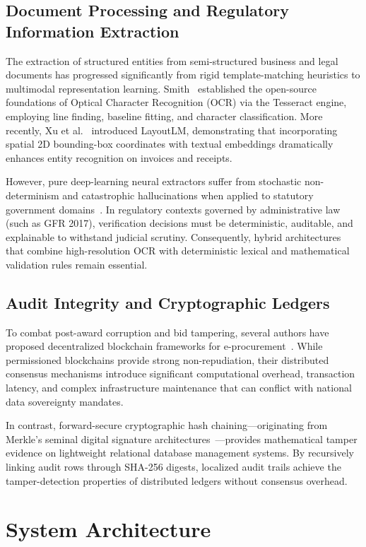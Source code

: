 \documentclass[conference]{IEEEtran}
\begin{document}
\subsection{Document Processing and Regulatory Information Extraction}
The extraction of structured entities from semi-structured business and legal documents has progressed significantly from rigid template-matching heuristics to multimodal representation learning. Smith~\cite{smith2007} established the open-source foundations of Optical Character Recognition (OCR) via the Tesseract engine, employing line finding, baseline fitting, and character classification. More recently, Xu et al.~\cite{xu2020} introduced LayoutLM, demonstrating that incorporating spatial 2D bounding-box coordinates with textual embeddings dramatically enhances entity recognition on invoices and receipts. 

However, pure deep-learning neural extractors suffer from stochastic non-determinism and catastrophic hallucinations when applied to statutory government domains~\cite{saraf2022}. In regulatory contexts governed by administrative law (such as GFR 2017), verification decisions must be deterministic, auditable, and explainable to withstand judicial scrutiny. Consequently, hybrid architectures that combine high-resolution OCR with deterministic lexical and mathematical validation rules remain essential.

\subsection{Audit Integrity and Cryptographic Ledgers}
To combat post-award corruption and bid tampering, several authors have proposed decentralized blockchain frameworks for e-procurement~\cite{saberi2019, rahman2023}. While permissioned blockchains provide strong non-repudiation, their distributed consensus mechanisms introduce significant computational overhead, transaction latency, and complex infrastructure maintenance that can conflict with national data sovereignty mandates. 

In contrast, forward-secure cryptographic hash chaining—originating from Merkle's seminal digital signature architectures~\cite{merkle1990}—provides mathematical tamper evidence on lightweight relational database management systems. By recursively linking audit rows through SHA-256 digests, localized audit trails achieve the tamper-detection properties of distributed ledgers without consensus overhead.

\section{System Architecture}
\end{document}
